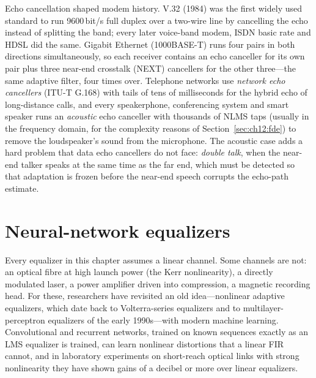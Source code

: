 
Echo cancellation shaped modem history. V.32 (1984) was the first widely used standard to run
9600\,bit/s full duplex over a two-wire line by cancelling the echo instead of splitting the band; every
later voice-band modem, ISDN basic rate and HDSL did the same. Gigabit Ethernet (1000BASE-T) runs four
pairs in both directions simultaneously, so each receiver contains an echo canceller for its own pair
plus three near-end crosstalk (NEXT) cancellers for the other three---the same adaptive filter,
four times over. Telephone networks use \emph{network echo cancellers} (ITU-T G.168) with tails of
tens of milliseconds for the hybrid echo of long-distance calls, and every speakerphone, conferencing
system and smart speaker runs an \emph{acoustic} echo canceller with thousands of NLMS taps (usually in
the frequency domain, for the complexity reasons of Section~\ref{sec:ch12:fde}) to remove the
loudspeaker's sound from the microphone. The acoustic case adds a hard problem that data echo
cancellers do not face: \emph{double talk}, when the near-end talker speaks at the same time as the
far end, which must be detected so that adaptation is frozen before the near-end speech corrupts the
echo-path estimate.


\section{Neural-network equalizers}
\label{sec:ch12:nn}

Every equalizer in this chapter assumes a linear channel. Some channels are not: an optical fibre at
high launch power (the Kerr nonlinearity), a directly modulated laser, a power amplifier driven into
compression, a magnetic recording head. For these, researchers have revisited an old idea---nonlinear
adaptive equalizers, which date back to Volterra-series equalizers and to multilayer-perceptron
equalizers of the early 1990s---with modern machine learning. Convolutional and recurrent networks,
trained on known sequences exactly as an LMS equalizer is trained, can learn nonlinear distortions that
a linear FIR cannot, and in laboratory experiments on short-reach optical links with strong
nonlinearity they have shown gains of a decibel or more over linear equalizers.

